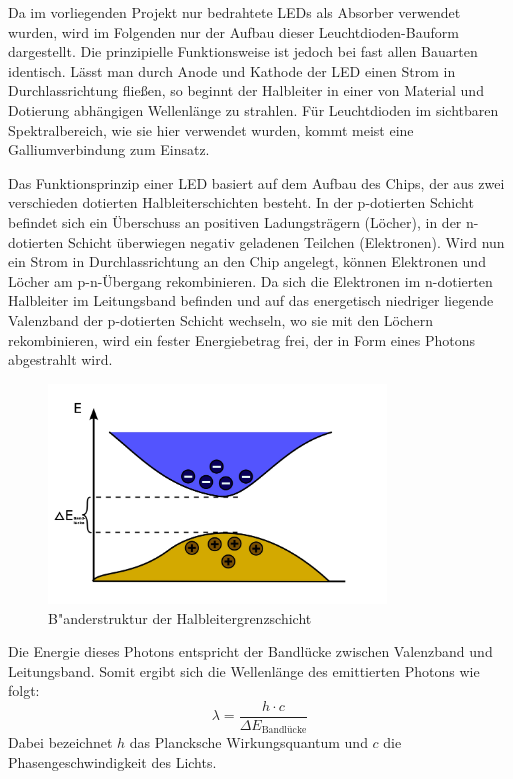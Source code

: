 \documentclass[11pt]{scrartcl}
\begin{document}
Da im vorliegenden Projekt nur bedrahtete LEDs als Absorber verwendet wurden, wird im Folgenden nur der Aufbau dieser Leuchtdioden-Bauform dargestellt. Die prinzipielle Funktionsweise ist jedoch bei fast allen Bauarten identisch. Lässt man durch Anode und Kathode der LED einen Strom in Durchlassrichtung fließen, so beginnt der Halbleiter in einer von Material und Dotierung abhängigen Wellenlänge zu strahlen. Für Leuchtdioden im sichtbaren Spektralbereich, wie sie hier verwendet wurden, kommt meist eine Galliumverbindung zum Einsatz.

Das Funktionsprinzip einer LED basiert auf dem Aufbau des Chips, der aus zwei verschieden dotierten Halbleiterschichten besteht. In der p-dotierten Schicht befindet sich ein Überschuss an positiven Ladungsträgern (Löcher), in der n-dotierten Schicht überwiegen negativ geladenen Teilchen (Elektronen). Wird nun ein Strom in Durchlassrichtung an den Chip angelegt, können Elektronen und Löcher am p-n-Übergang rekombinieren. Da sich die Elektronen im n-dotierten Halbleiter im Leitungsband befinden und auf das energetisch niedriger liegende Valenzband der p-dotierten Schicht wechseln, wo sie mit den Löchern rekombinieren, wird ein fester Energiebetrag frei, der in Form eines Photons abgestrahlt wird.

\begin{figure}[ht]
\begin{center}
\includegraphics[width=0.8\textwidth]{band.jpg}
\end{center}
\vspace{-1.5\baselineskip}
\caption{B"anderstruktur der Halbleitergrenzschicht}
\label{Baendermodell}
\end{figure}

Die Energie dieses Photons entspricht der Bandlücke zwischen Valenzband und Leitungsband. Somit ergibt sich die Wellenlänge des emittierten Photons wie folgt:
 \[ \lambda = \frac{h \cdot c}{\Delta E_{\text{Bandlücke}}} \]
Dabei bezeichnet $h$ das Plancksche Wirkungsquantum und $c$ die Phasengeschwindigkeit des Lichts.
\end{document}
